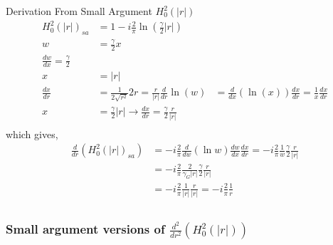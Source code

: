 \documentclass{article}
\newcommand{\0}{\varnothing}
\begin{document}
\begin{minipage}[t]{0.5\textwidth}
{\centering Derivation From Small Argument $H_0^2(|r|)$\ \\}
\begin{align*}
	H_0^2(|r|)_{sa} &= 1 - i \frac{2}{\pi} \ln \left(\frac{\gamma}{2} |r| \right)\\
	w &= \frac{\gamma}{2} x \\
	\frac{dw}{dx} = \frac{\gamma}{2} \\
	x &= |r| \\
	\frac{dx}{dr} &= \frac{1}{2 \sqrt{r^2}} 2 r = \frac{r}{|r|}
	\frac{d}{dr} \ln(w) &= \frac{d}{dx}(\ln(x)) \frac{dx}{dr}  = \frac{1}{x} \frac{dx}{dr}\\
	x &= \frac{\gamma}{2} |r| \rightarrow \frac{dx}{dr} = \frac{\gamma}{2}\frac{r}{|r|}\\
\end{align*}
which gives,
\begin{align*}	
	\frac{d}{dr}\left(H_0^2 (|r|)_{sa}\right) & = - i \frac{2}{\pi} \frac{d}{dw} (\ln w) \frac{dw}{dx} \frac{dx}{dr} 
	= - i \frac{2}{\pi} \frac{1}{w} \frac{\gamma}{2} \frac{r}{|r|} \\
	&= - i \frac{2}{\pi} \frac{2}{\gamma_G |r|} \frac{\gamma}{2} \frac{r}{|r|} \\
	&= - i \frac{2}{\pi} \frac{1}{|r|}\frac{r}{|r|}  = - i \frac{2}{\pi} \frac{1}{r} \\
\end{align*}
\end{minipage}

\subsubsection{Small argument versions of $\frac{d^2}{dr^2}(H_0^2(|r|))$}
\end{document}
